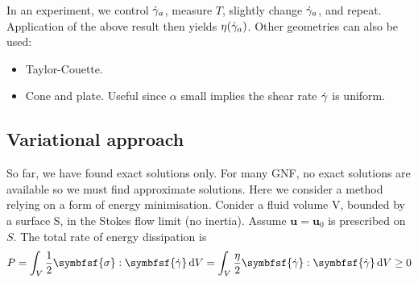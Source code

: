 \documentclass{jknotes}
\begin{document}
In an experiment, we control $\dot{\gamma}_a$, measure $T$, slightly change
$\dot{\gamma}_a$, and repeat. Application of the above result then yields
$\eta(\dot{\gamma}_a)$. Other geometries can also be used:
\begin{itemize}
	\item Taylor-Couette.
		\begin{center}
		\end{center}
	\item Cone and plate. Useful since $\alpha$ small implies the shear rate
		$\dot{\gamma}$ is uniform.
		\begin{center}
		\end{center}
\end{itemize}

\subsection{Variational approach}
So far, we have found exact solutions only. For many GNF, no exact solutions
are available so we must find approximate solutions. Here we consider a method
relying on a form of energy minimisation. Conider a fluid volume V, bounded by
a surface S, in the Stokes flow limit (no inertia). Assume $\symbf{u} = \symbf{u}_0$
is prescribed on $S$. The total rate of energy dissipation is
\begin{equation}
	P = \int_V \frac{1}{2}\symbfsf{\sigma}:\symbfsf{\srate}\,\diffd V = \int_V
	\frac{\eta}{2} \symbfsf{\srate}:\symbfsf{\srate} \, \diffd V \ge 0
\end{equation}
\end{document}
